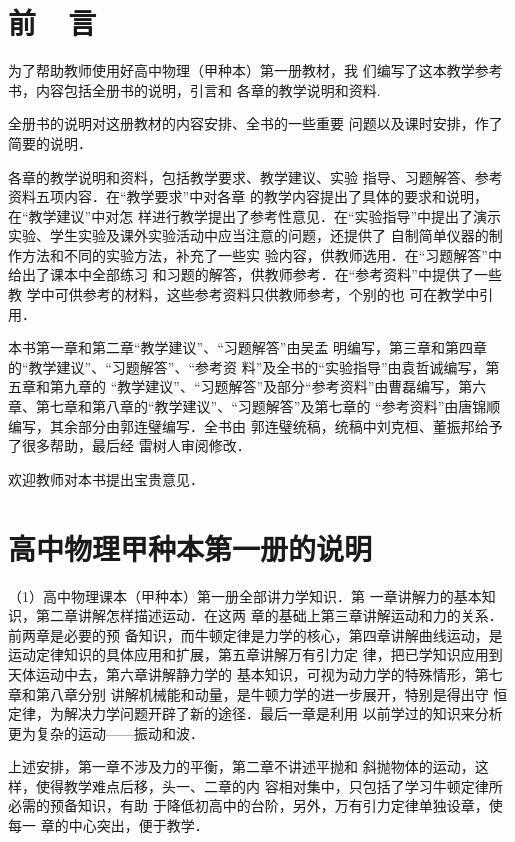 \chapter{前~~言}

为了帮助教师使用好高中物理（甲种本）第一册教材，我
们编写了这本教学参考书，内容包括全册书的说明，引言和
各章的教学说明和资料.

全册书的说明对这册教材的内容安排、全书的一些重要
问题以及课时安排，作了简要的说明．

各章的教学说明和资料，包括教学要求、教学建议、实验
指导、习题解答、参考资料五项内容．在“教学要求”中对各章
的教学内容提出了具体的要求和说明，在“教学建议”中对怎
样进行教学提出了参考性意见．在“实验指导”中提出了演示
实验、学生实验及课外实验活动中应当注意的问题，还提供了
自制简单仪器的制作方法和不同的实验方法，补充了一些实
验内容，供教师选用．在“习题解答”中给出了课本中全部练习
和习题的解答，供教师参考．在“参考资料”中提供了一些教
学中可供参考的材料，这些参考资料只供教师参考，个别的也
可在教学中引用．

本书第一章和第二章“教学建议”、“习题解答”由吴孟
明编写，第三章和第四章的“教学建议”、“习题解答”、“参考资
料”及全书的“实验指导”由袁哲诚编写，第五章和第九章的
“教学建议”、“习题解答”及部分“参考资料”由曹磊编写，第六
章、第七章和第八章的“教学建议”、“习题解答”及第七章的
“参考资料”由唐锦顺编写，其余部分由郭连璧编写．全书由
郭连璧统稿，统稿中刘克桓、董振邦给予了很多帮助，最后经
雷树人审阅修改．

欢迎教师对本书提出宝贵意见．


\chapter{高中物理甲种本第一册的说明}

（1）高中物理课本（甲种本）第一册全部讲力学知识．第
一章讲解力的基本知识，第二章讲解怎样描述运动．在这两
章的基础上第三章讲解运动和力的关系．前两章是必要的预
备知识，而牛顿定律是力学的核心，第四章讲解曲线运动，是
运动定律知识的具体应用和扩展，第五章讲解万有引力定
律，把已学知识应用到天体运动中去，第六章讲解静力学的
基本知识，可视为动力学的特殊情形，第七章和第八章分别
讲解机械能和动量，是牛顿力学的进一步展开，特别是得出守
恒定律，为解决力学问题开辟了新的途径．最后一章是利用
以前学过的知识来分析更为复杂的运动——振动和波．

上述安排，第一章不涉及力的平衡，第二章不讲述平抛和
斜抛物体的运动，这样，使得教学难点后移，头一、二章的内
容相对集中，只包括了学习牛顿定律所必需的预备知识，有助
于降低初高中的台阶，另外，万有引力定律单独设章，使每一
章的中心突出，便于教学．


